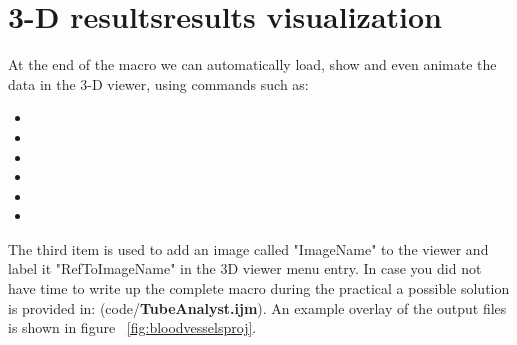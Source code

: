 \section{3-D resultsresults visualization}
At the end of the macro we can automatically load, show and even animate the data in the 3-D viewer, using commands such as:

\begin{itemize}
\item {}
\item {}
\item {}
\item {}
\item {}
\item {}
\end{itemize}
The third item is used to add an image called "ImageName" to the viewer and label it "RefToImageName" in the 3D viewer  menu entry.
In case you did not have time to write up the complete macro during the practical a possible solution is provided in: (code/\textbf{TubeAnalyst.ijm}). An example overlay of the output files is shown in figure ~\ref{fig:bloodvesselsproj}.
